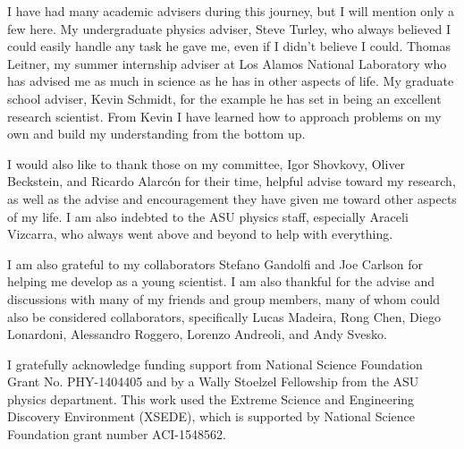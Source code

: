 \begin{acknowledgements}
I have had many academic advisers during this journey, but I will mention only a few here. My undergraduate physics adviser, Steve Turley, who always believed I could easily handle any task he gave me, even if I didn't believe I could. Thomas Leitner, my summer internship adviser at Los Alamos National Laboratory who has advised me as much in science as he has in other aspects of life. My graduate school adviser, Kevin Schmidt, for the example he has set in being an excellent research scientist. From Kevin I have learned how to approach problems on my own and build my understanding from the bottom up.

I would also like to thank those on my committee, Igor Shovkovy, Oliver Beckstein, and Ricardo Alarc\'on for their time, helpful advise toward my research, as well as the advise and encouragement they have given me toward other aspects of my life. I am also indebted to the ASU physics staff, especially Araceli Vizcarra, who always went above and beyond to help with everything.

I am also grateful to my collaborators Stefano Gandolfi and Joe Carlson for helping me develop as a young scientist. I am also thankful for the advise and discussions with many of my friends and group members, many of whom could also be considered collaborators, specifically Lucas Madeira, Rong Chen, Diego Lonardoni, Alessandro Roggero, Lorenzo Andreoli, and Andy Svesko.

I gratefully acknowledge funding support from National Science Foundation Grant No. PHY-1404405 and by a Wally Stoelzel Fellowship from the ASU physics department. This work used the Extreme Science and Engineering Discovery Environment (XSEDE), which is supported by National Science Foundation grant number ACI-1548562.
\end{acknowledgements}
